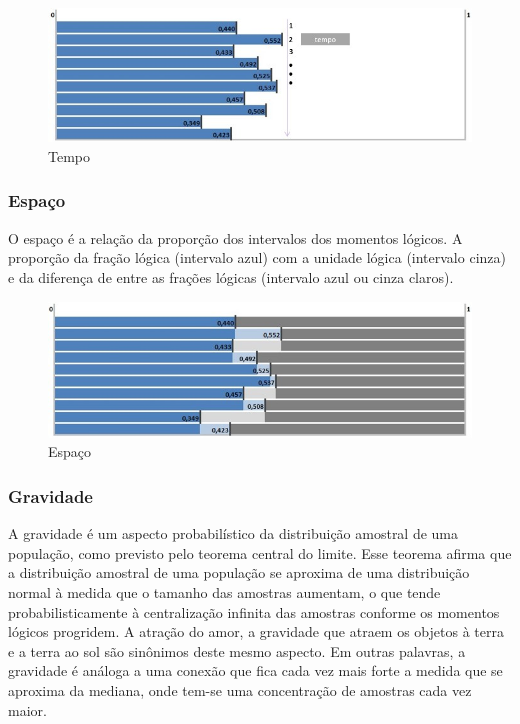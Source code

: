 \begin{figure}[H]
\caption{Tempo}
\label{fig:consciousness_time}
\centering
\includegraphics[scale=.8]{sections/images/consciousness_time.jpg}
\end{figure}

\subsubsection{Espaço}
O espaço é a relação da proporção dos intervalos dos momentos lógicos. A proporção da fração lógica (intervalo azul) com a unidade lógica (intervalo cinza) e da diferença de entre as frações lógicas (intervalo azul ou cinza claros).

\begin{figure}[H]
\caption{Espaço}
\label{fig:consciousness_space}
\centering
\includegraphics[scale=.8]{sections/images/consciousness_space.jpg}
\end{figure}

\subsubsection{Gravidade}
A gravidade é um aspecto probabilístico da distribuição amostral de uma população, como previsto pelo teorema central do limite. Esse teorema afirma que a distribuição amostral de uma população se aproxima de uma distribuição normal à medida que o tamanho das amostras aumentam, o que tende probabilisticamente à centralização infinita das amostras conforme os momentos lógicos progridem. A atração do amor, a gravidade que atraem os objetos à terra e a terra ao sol são sinônimos deste mesmo aspecto. Em outras palavras, a gravidade é análoga a uma conexão que fica cada vez mais forte a medida que se aproxima da mediana, onde tem-se uma concentração de amostras cada vez maior.

